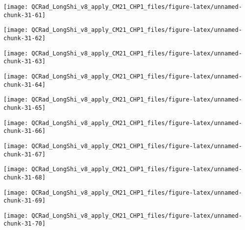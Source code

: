 \documentclass[
  10pt,
  a4paper,oneside]{article}
\begin{document}
\begin{center}\texttt{[image: QCRad\_LongShi\_v8\_apply\_CM21\_CHP1\_files/figure-latex/unnamed-chunk-31-61]} \end{center}

\begin{center}\texttt{[image: QCRad\_LongShi\_v8\_apply\_CM21\_CHP1\_files/figure-latex/unnamed-chunk-31-62]} \end{center}

\begin{center}\texttt{[image: QCRad\_LongShi\_v8\_apply\_CM21\_CHP1\_files/figure-latex/unnamed-chunk-31-63]} \end{center}

\begin{center}\texttt{[image: QCRad\_LongShi\_v8\_apply\_CM21\_CHP1\_files/figure-latex/unnamed-chunk-31-64]} \end{center}

\begin{center}\texttt{[image: QCRad\_LongShi\_v8\_apply\_CM21\_CHP1\_files/figure-latex/unnamed-chunk-31-65]} \end{center}

\begin{center}\texttt{[image: QCRad\_LongShi\_v8\_apply\_CM21\_CHP1\_files/figure-latex/unnamed-chunk-31-66]} \end{center}

\begin{center}\texttt{[image: QCRad\_LongShi\_v8\_apply\_CM21\_CHP1\_files/figure-latex/unnamed-chunk-31-67]} \end{center}

\begin{center}\texttt{[image: QCRad\_LongShi\_v8\_apply\_CM21\_CHP1\_files/figure-latex/unnamed-chunk-31-68]} \end{center}

\begin{center}\texttt{[image: QCRad\_LongShi\_v8\_apply\_CM21\_CHP1\_files/figure-latex/unnamed-chunk-31-69]} \end{center}

\begin{center}\texttt{[image: QCRad\_LongShi\_v8\_apply\_CM21\_CHP1\_files/figure-latex/unnamed-chunk-31-70]} \end{center}
\end{document}
